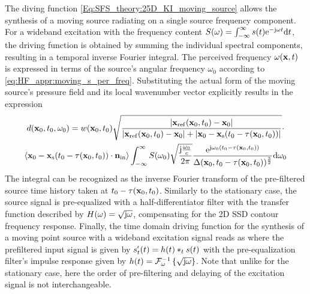 The diving function \eqref{Eq:SFS_theory:25D_KI_moving_source} allows the synthesis of a moving source radiating on a single source frequency component.
For a wideband excitation with the frequency content $S(\omega) = \int_{-\infty}^{\infty} s(t) \te^{-\ti \omega t} \td t$, the driving function is obtained by summing the individual spectral components, resulting in a temporal inverse Fourier integral.
The perceived frequency $\omega(\vx,t)$ is expressed in terms of the source's angular frequency $\omega_0$ according to \eqref{eq:HF_appr:moving_s_per_freq}.%
Substituting the actual form of the moving source's pressure field and its local wavenumber vector explicitly results in the expression
\begin{multline}
\small
d(\vxo,t_0,\omega_0) = w(\vxo,t_0) 
\sqrt{\frac{|\vxref(\vxo,t_0)-\vxo| }{|\vxref(\vxo,t_0)-\vxo|+|\vxo - \vxs(t_0-\tau(\vxo,t_0))|}}
\cdot \\ %
\left< \vxo -\vxs(t_0-\tau(\vxo,t_0)) \cdot \vni \right>
\int_{-\infty}^{\infty} S(\omega_0)
\sqrt{\frac{\ti \frac{\omega_0}{c}}{2\pi}}
\frac{\te^{\ti \omega_0\left( t_0 - \tau( \vxo,t_0 )\right)}}{\Delta(\vxo,t_0-\tau( \vxo, t_0 ))^{\frac{3}{2}}}
 \td \omega_0
\end{multline}
The integral can be recognized as the inverse Fourier transform of the pre-filtered source time history taken at $t_0 - \tau( \vxo,t_0 )$.
Similarly to the stationary case, the source signal is pre-equalized with a half-differentiator filter with the transfer function described by $H(\omega) = \sqrt{\ti \omega}$, compensating for the 2D SSD contour frequency response.
Finally, the time domain driving function for the synthesis of a moving point source with a wideband excitation signal reads as
where the prefiltered input signal is given by $ s^{\nshortmid}_t(t) = h(t) \ast_{t} s(t)$ with the pre-equalization filter's impulse response given by $h(t) = \IFT[\omega]{ \sqrt{\ti \omega} }$.
Note that unlike for the stationary case, here the order of pre-filtering and delaying of the excitation signal is not interchangeable.

